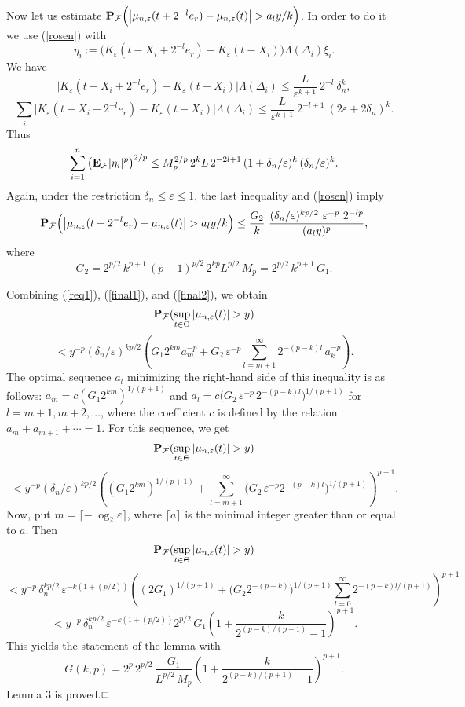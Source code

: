 \documentclass[12pt]{article}
\theoremstyle{remark}
\begin{document}
Now let us estimate
${\bf P}_{\cal F}\Big(
\big|\mu_{n,\varepsilon}(t+2^{-l}e_r)-\mu_{n,\varepsilon}(t)\big|
>a_l y/k\Big)$. In order to do it we use (\ref{rosen}) with
$$\eta_i:= \Big(K_{\varepsilon}(t-X_{i}+2^{-l}e_r)-
K_{\varepsilon}(t-X_{i}) \Big)
\Lambda(\Delta_i)\xi_{i}.$$
We have
$$ \Big|K_{\varepsilon}(t-X_{i}+2^{-l}e_r)-
K_{\varepsilon}(t-X_{i}) \Big| \Lambda(\Delta_i) \le
\frac{L}{\varepsilon^{k+1}}\ 2^{-l}\ \delta_n^k,
$$
$$
\sum_i \Big|K_{\varepsilon}(t-X_{i}+2^{-l}e_r)-
K_{\varepsilon}(t-X_{i}) \Big|\Lambda(\Delta_i)\le
\frac{L}{\varepsilon^{k+1}}\ 2^{-l+1}\ (2\varepsilon+2\delta_n)^k.
$$
Thus
$$\sum^n_{i=1}\big({\bf E}_{\cal F}|\eta_i|^p\big )^{2/p}\le
M_p^{2/p}\, 2^k L\, 2^{-2l+1}\, (1+\delta_n/\varepsilon)^{k}
\, (\delta_n/\varepsilon)^{k}.
$$
Again, under the restriction $\delta_n\le\varepsilon\le 1$, the last inequality and (\ref{rosen}) imply
\begin{eqnarray}\label{final2}
 {\bf P}_{\cal F}\Big(
\big|\mu_{n,\varepsilon}(t+2^{-l}e_r)-\mu_{n,\varepsilon}(t)\big|
>a_l y/k\Big)
\le \frac{G_2}{k}
\ \frac{(\delta_n/\varepsilon)^{kp/2}\ \varepsilon^{-p} \ 2^{-lp}}{(a_l y)^p},
\end{eqnarray}
where
$$G_2= 2^{p/2}\,k^{p+1}\, (p-1)^{p/2}\, 2^{kp} L^{p/2}\,  M_p =2^{p/2}\,k^{p+1}\, G_1.$$

Combining (\ref{req1}), (\ref{final1}), and (\ref{final2}), we obtain
$${\bf P}_{\cal F}(\sup_{t\in \Theta}|\mu_{n,\varepsilon}(t)|>y)$$
$$< y^{-p} (\delta_n/\varepsilon)^{kp/2}
\left( G_1 2^{km} a_m^{-p}
+G_2\, \varepsilon^{-p} \sum_{l=m+1}^\infty 2^{-(p-k)l}\, a_k^{-p}
\right).
$$
The optimal sequence $a_l$ minimizing the right-hand side of this inequality
is as follows: $a_m=c (G_1 2^{km})^{1/(p+1)} $ and
$a_l=c \big(G_2\, \varepsilon^{-p} \, 2^{-(p-k)l}\big)^{1/(p+1)}$  for $l=m+1,m+2,\dots$, where the coefficient $c$ is defined by the relation
$a_m+a_{m+1}+\cdots=1$.
For this sequence, we get
$${\bf P}_{\cal F}(\sup_{t\in \Theta}|\mu_{n,\varepsilon}(t)|>y)$$
$$< y^{-p} (\delta_n/\varepsilon)^{kp/2}
\left( (G_1 2^{km})^{1/(p+1)}
+\sum_{l=m+1}^\infty \Big(G_2\, \varepsilon^{-p}  2^{-(p-k)l}
\Big)^{1/(p+1)}
\right)^{p+1}.
$$
Now, put
$m = \lceil- \log_2 \varepsilon\rceil$, where $\lceil a \rceil$ is the minimal
integer greater than or equal to $a$. Then
$${\bf P}_{\cal F}(\sup_{t\in \Theta}|\mu_{n,\varepsilon}(t)|>y)$$
$$< y^{-p}\, \delta_n^{kp/2}\, \varepsilon^{-k(1+ (p/2))}
\left( (2 G_1 )^{1/(p+1)}
+\big(G_2  2^{-(p-k)} \big)^{1/(p+1)} \sum_{l=0}^\infty 2^{-(p-k)l/(p+1)}
\right)^{p+1}
$$
$$< y^{-p}\, \delta_n^{kp/2}\,\varepsilon^{-k(1+ (p/2))}
2^{p/2} \,G_1
\left( 1
+\frac{k}{2^{(p-k)/(p+1)} - 1}
\right)^{p+1}.
$$
This yields the statement of the lemma with
$$G(k,p)=2^p\,2^{p/2} \,\frac{G_1}{L^{p/2}\,  M_p}
\left( 1
+\frac{k}{2^{(p-k)/(p+1)} - 1}
\right)^{p+1}.
$$
Lemma 3 is proved.$\hfill\Box$
\end{document}
